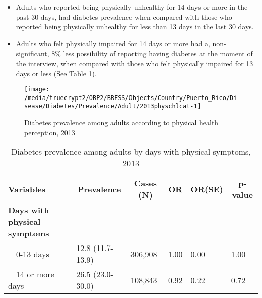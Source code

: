  
\newpage

 \newpage
\begin{itemize}

\item Adults who reported being physically unhealthy for 14 days or more in the past 30 days, had 
 diabetes prevalence when compared with 
those who reported being physically unhealthy for less than 13 days in the last 30 days.


\item Adults who felt physically impaired for 14 days or more had a, non-significant, 8\% less possibility of reporting having diabetes at the moment of the interview, when compared with those who felt physically impaired for 13 days or less (See Table \ref{tab:phys.Diabetes.2013}).

\end{itemize}

\begin{figure}[H]
\caption{Diabetes prevalence among adults according to physical health perception, 2013}
\label{fig:phys.Diabetes.2013}
\begin{knitrout}
\color{fgcolor}

{\centering \texttt{[image: /media/truecrypt2/ORP2/BRFSS/Objects/Country/Puerto\_Rico/Disease/Diabetes/Prevalence/Adult/2013physchlcat-1]} 

}



\end{knitrout}
 \end{figure}

\begin{table}[H]
\caption{Diabetes prevalence among adults by days with physical symptoms, 2013\label{tab:phys.Diabetes.2013}} 
\begin{center}
\begin{tabular}{llllll}
\hline\hline
\multicolumn{1}{l}{Variables}&\multicolumn{1}{c}{Prevalence}&\multicolumn{1}{c}{Cases (N)}&\multicolumn{1}{c}{OR}&\multicolumn{1}{c}{OR(SE)}&\multicolumn{1}{c}{p-value}\tabularnewline
\hline
{\bfseries Days with physical symptoms}&&&&&\tabularnewline
~~0-13 days&12.8 (11.7-13.9)&306,908&1.00&0.00&1.00\tabularnewline
~~14 or more days&26.5 (23.0-30.0)&108,843&0.92&0.22&0.72\tabularnewline
\hline
\end{tabular}\end{center}

\end{table}


